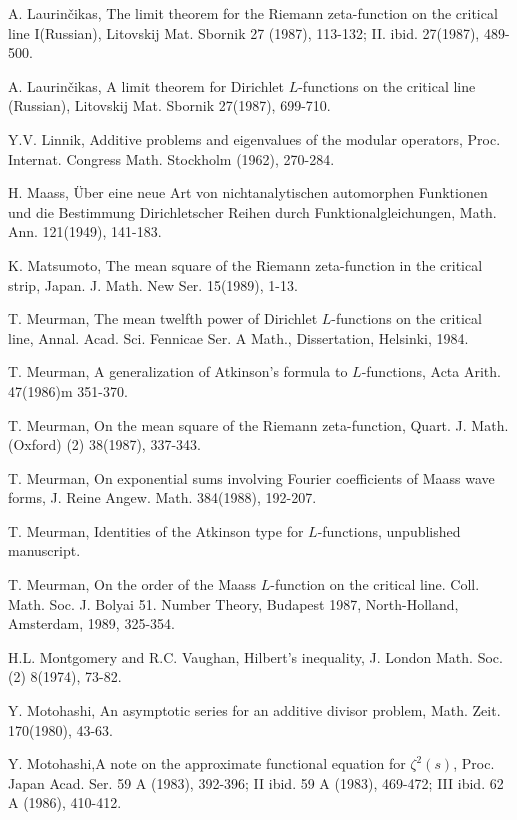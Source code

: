 \begin{thebibliography}{99}
 A. Laurin\v cikas, The limit theorem for the Riemann zeta-function on the critical line I(Russian), Litovskij Mat. Sbornik 27 (1987), 113-132; II. ibid. 27(1987), 489-500.

 A. Laurin\v cikas, A limit theorem for Dirichlet $L$-functions on the critical line (Russian), Litovskij Mat. Sbornik 27(1987), 699-710.

 Y.V. Linnik, Additive problems and eigenvalues of the modular operators, Proc. Internat. Congress Math. Stockholm (1962), 270-284.

 H. Maass, \"Uber eine neue Art von nichtanalytischen automorphen Funktionen und die Bestimmung Dirichletscher Reihen durch Funktionalgleichungen, Math. Ann. 121(1949), 141-183.

 K. Matsumoto, The mean square of the Riemann zeta-function in the critical strip, Japan. J. Math. New Ser. 15(1989), 1-13.

 T. Meurman, The mean twelfth power of Dirichlet $L$-functions on the critical line, Annal. Acad. Sci. Fennicae Ser. A Math., Dissertation, Helsinki, 1984.

 T. Meurman, A generalization of Atkinson's formula to $L$-functions, Acta Arith. 47(1986)m 351-370.

 T. Meurman, On the mean square of the Riemann zeta-function, Quart. J. Math. (Oxford) (2) 38(1987), 337-343.

 T. Meurman, On exponential sums involving Fourier coefficients of Maass wave forms, J. Reine Angew. Math. 384(1988), 192-207.

 T. Meurman, Identities of the Atkinson type for $L$-functions, unpublished manuscript.

 T. Meurman, On the order of the Maass $L$-function on the critical line. Coll. Math. Soc. J. Bolyai 51. Number Theory, Budapest 1987, North-Holland, Amsterdam, 1989, 325-354.

 H.L. Montgomery and R.C. Vaughan, Hilbert's inequality, J. London Math. Soc. (2) 8(1974), 73-82.

 Y. Motohashi, An asymptotic series for an additive divisor problem, Math. Zeit. 170(1980), 43-63.

 Y. Motohashi,\pageoriginale A note on the approximate functional equation for $\zeta^2(s)$, Proc. Japan Acad. Ser. 59 A (1983), 392-396; II ibid. 59 A (1983), 469-472; III ibid. 62 A (1986), 410-412.
 

\end{thebibliography}
